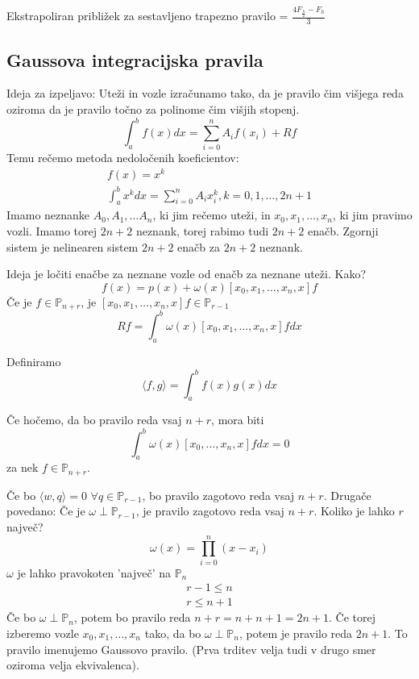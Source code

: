 \documentclass[a4paper,12pt]{article}
\newcommand{\innerproduct}[2]{\langle #1, #2 \rangle}
\theoremstyle{definition}
\theoremstyle{remark}
\newcommand{\Pp}{\mathbb{P}}
\begin{document}
Ekstrapoliran približek za sestavljeno trapezno pravilo = $\frac{4 F_{\frac{h}{2}} - F_h}{3}$

\subsection{Gaussova integracijska pravila}
Ideja za izpeljavo: Uteži in vozle izračunamo tako, da je pravilo čim višjega reda oziroma da je pravilo točno za polinome čim višjih stopenj.
\begin{equation*}
    \int_{a}^{b} f(x) dx = \sum_{i=0}^{n} A_i f(x_i) + Rf
\end{equation*}
Temu rečemo metoda nedoločenih koeficientov:
\begin{gather*}
    f(x) = x^k \\
    \int_{a}^{b} x^k dx = \sum_{i=0}^{n} A_i x_i^k ,k = 0, 1, \dots, 2n + 1
\end{gather*}
Imamo neznanke $A_0, A_1, \dots A_n$, ki jim rečemo uteži, in $x_0, x_1, \dots, x_n$, ki jim pravimo vozli. Imamo torej $2n + 2$ neznank, torej rabimo tudi $2n + 2$ enačb.
Zgornji sistem je nelinearen sistem $2n + 2$ enačb za $2n + 2$ neznank.

Ideja je ločiti enačbe za neznane vozle od enačb za neznane uteži. Kako?
\begin{equation*}
    f(x) = p(x) + \omega(x) [x_0, x_1, \dots, x_n, x] f
\end{equation*}
Če je $f \in \Pp_{n+r}$, je $[x_0, x_1, \dots, x_n, x] f \in \Pp_{r-1}$
\begin{equation*}
    Rf = \int_{a}^{b} \omega (x) [x_0, x_1, \dots, x_n, x] f dx
\end{equation*}

Definiramo 
\begin{equation*}
    \innerproduct{f}{g} = \int_{a}^{b} f(x) g(x) dx
\end{equation*}



Če hočemo, da bo pravilo reda vsaj $n+r$, mora biti
\begin{equation*}
    \int_{a}^{b} \omega (x) [x_0, \dots, x_n, x] f dx = 0
\end{equation*}
za nek $f \in \Pp_{n+r}$.

Če bo $\innerproduct{w}{q} = 0$ $\forall q \in \Pp_{r-1}$, bo pravilo zagotovo reda vsaj $n + r$. Drugače povedano: Če je $\omega \perp \Pp_{r-1}$,
je pravilo zagotovo reda vsaj $n + r$. Koliko je lahko $r$ največ?
\begin{equation*}
    \omega(x) = \prod_{i = 0}^{n} (x-x_i)
\end{equation*}
$\omega$ je lahko pravokoten 'največ' na $\Pp_n$
\begin{gather*}
    r - 1 \leq n \\
    r \leq n + 1
\end{gather*}
Če bo $\omega \perp \Pp_n$, potem bo pravilo reda $n+r = n + n + 1 = 2n + 1$. Če torej izberemo vozle $x_0, x_1, \dots, x_n$ tako, da bo $\omega \perp \Pp_n$,
potem je pravilo reda $2n + 1$. To pravilo imenujemo Gaussovo pravilo. (Prva trditev velja tudi v drugo smer oziroma velja ekvivalenca).
\end{document}
